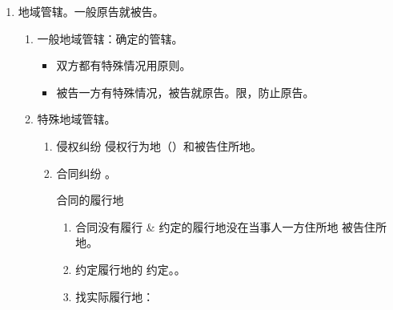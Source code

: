 \begin{enumerate}
        \begin{kk}{高院的管辖}
          \begin{enumerate}
            \item 本辖区范围重大影响的。
          \end{enumerate}
        \end{kk}

        \begin{kk}{最高院}
          \begin{enumerate}
            \item 全国范围重大影响。
            \item 认为应当由本院审理的案件。宣告性的意义，实践中这个法条从来没用过。
            \item {}。
          \end{enumerate}
        \end{kk}
  \item 地域管辖。一般原告就被告。
        \begin{enumerate}
          \item 一般地域管辖：确定的管辖。
                \begin{itemize}
                  \item 双方都有特殊情况用原则。
                  \item 被告一方有特殊情况，被告就原告。限，防止原告。
                \end{itemize}
          \item 特殊地域管辖。
                \begin{enumerate}
                  \item 侵权纠纷 \yjt 侵权行为地（）和被告住所地。
                  \item 合同纠纷 \yjt {}。
                        \begin{kk}{合同的履行地}
                          \begin{enumerate}
                            \item 合同没有履行 \& 约定的履行地没在当事人一方住所地 \yjt 被告住所地。
                            \item 约定履行地的 \yjt 约定。。
                            \item 找实际履行地：
                                  \begin{itemize}

\end{itemize}
\end{enumerate}
\end{kk}
\end{enumerate}
\end{enumerate}
\end{enumerate}
